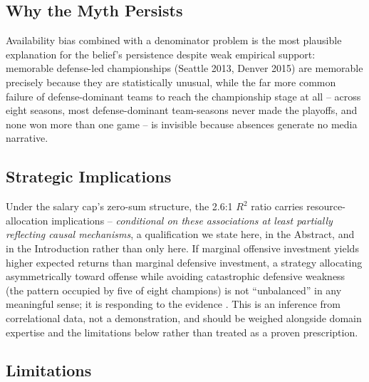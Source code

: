\documentclass[12pt,a4paper]{article}
\begin{document}
\subsection{Why the Myth Persists}
\label{sec:myth}

Availability bias combined with a denominator problem \citep{tversky1973availability} is the most plausible explanation for the belief's persistence despite weak empirical support: memorable defense-led championships (Seattle 2013, Denver 2015) are memorable precisely because they are statistically unusual, while the far more common failure of defense-dominant teams to reach the championship stage at all -- across eight seasons, most defense-dominant team-seasons never made the playoffs, and none won more than one game -- is invisible because absences generate no media narrative.

\subsection{Strategic Implications}
\label{sec:strategic}

Under the salary cap's zero-sum structure, the 2.6:1 $R^2$ ratio carries resource-allocation implications -- \emph{conditional on these associations at least partially reflecting causal mechanisms}, a qualification we state here, in the Abstract, and in the Introduction rather than only here. If marginal offensive investment yields higher expected returns than marginal defensive investment, a strategy allocating asymmetrically toward offense while avoiding catastrophic defensive weakness (the pattern occupied by five of eight champions) is not ``unbalanced'' in any meaningful sense; it is responding to the evidence \citep{mulholland2019optimizing}. This is an inference from correlational data, not a demonstration, and should be weighed alongside domain expertise and the limitations below rather than treated as a proven prescription.

\subsection{Limitations}
\label{sec:limitations}
\end{document}
